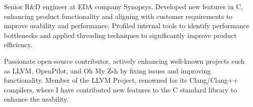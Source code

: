 

\begin{cvparagraph}

Senior R\&D engineer at EDA company Synopsys. Developed new features in C, enhancing product functionality and aligning with customer requirements to improve usability and performance. Profiled internal tools to identify performance bottlenecks and applied threading techniques to significantly improve product efficiency.

Passionate open-source contributor, actively enhancing well-known projects such as LLVM, OpenPilot, and Oh My Zsh by fixing issues and improving functionality. Member of the LLVM Project, renowned for its Clang/Clang++ compilers, where I have contributed new features to the C standard library to enhance the usability.
\end{cvparagraph}
